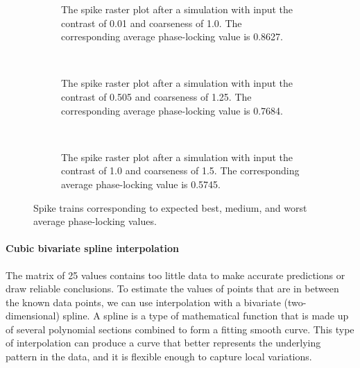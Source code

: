 \begin{figure}[p]
    \centering
    \begin{subfigure}[b]{\textwidth}
        \centering
        
        \vspace{-\baselineskip}
        \caption{The spike raster plot after a simulation with input the contrast of 0.01 and coarseness of 1.0. The corresponding average phase-locking value is 0.8627.}
        \label{fig:raster-best}
    \end{subfigure}
    \\ \vspace{\baselineskip}
    \begin{subfigure}[b]{\textwidth}
        \centering
        
        \vspace{-\baselineskip}
        \caption{The spike raster plot after a simulation with input the contrast of 0.505 and coarseness of 1.25. The corresponding average phase-locking value is 0.7684.}
        \label{fig:raster-mid}
    \end{subfigure}
    \\ \vspace{\baselineskip}
    \begin{subfigure}[b]{\textwidth}
        \centering
        
        \vspace{-\baselineskip}
        \caption{The spike raster plot after a simulation with input the contrast of 1.0 and coarseness of 1.5. The corresponding average phase-locking value is 0.5745.}
        \label{fig:raster-worst}
    \end{subfigure}
    \caption[Best-medium-worst spike trains]{Spike trains corresponding to expected best, medium, and worst average phase-locking values.}
    \label{fig:three-rasters}
\end{figure}


\paragraph{Cubic bivariate spline interpolation}

The matrix of 25 values contains too little data to make accurate predictions or draw reliable conclusions. To estimate the values of points that are in between the known data points, we can use interpolation with a bivariate (two-dimensional) spline. A spline is a type of mathematical function that is made up of several polynomial sections combined to form a fitting smooth curve. This type of interpolation can produce a curve that better represents the underlying pattern in the data, and it is flexible enough to capture local variations. 

